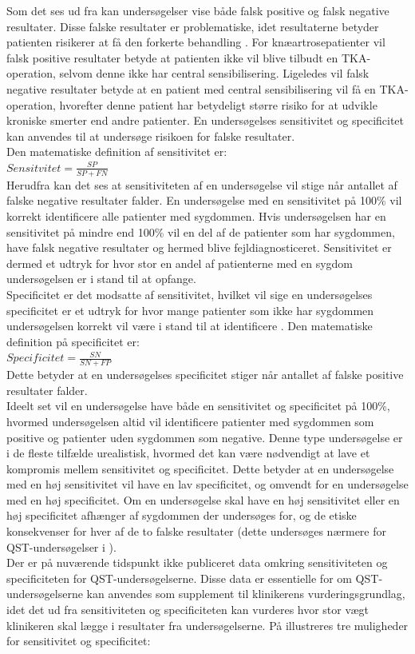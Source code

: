 Som det ses ud fra  kan undersøgelser vise både falsk positive og falsk negative resultater. Disse falske resultater er problematiske, idet resultaterne betyder patienten risikerer at få den forkerte behandling \citep{Lalkhen2008}. For knæartrosepatienter vil falsk positive resultater betyde at patienten ikke vil blive tilbudt en TKA-operation, selvom denne ikke har central sensibilisering. Ligeledes vil falsk negative resultater betyde at en patient med central sensibilisering vil få en TKA-operation, hvorefter denne patient har betydeligt større risiko for at udvikle kroniske smerter end andre patienter. En undersøgelses sensitivitet og specificitet kan anvendes til at undersøge risikoen for falske resultater. \\
Den matematiske definition af sensitivitet er: \\
$Sensitvitet=\frac{SP}{SP+FN}$ \\
Herudfra kan det ses at sensitiviteten af en undersøgelse vil stige når antallet af falske negative resultater falder. En undersøgelse med en sensitivitet på 100\% vil korrekt identificere alle patienter med sygdommen. Hvis undersøgelsen har en sensitivitet på mindre end 100\% vil en del af de patienter som har sygdommen, have falsk negative resultater og hermed blive fejldiagnosticeret. Sensitivitet er dermed et udtryk for hvor stor en andel af patienterne med en sygdom undersøgelsen er i stand til at opfange. \citep{Lalkhen2008} \\
Specificitet er det modsatte af sensitivitet, hvilket vil sige en undersøgelses specificitet er et udtryk for hvor mange patienter som ikke har sygdommen undersøgelsen korrekt vil være i stand til at identificere \citep{Lalkhen2008}. Den matematiske definition på specificitet er: \\
$Specificitet=\frac{SN}{SN+FP}$ \\
Dette betyder at en undersøgelses specificitet stiger når antallet af falske positive resultater falder. \citep{Lalkhen2008} \\
Ideelt set vil en undersøgelse have både en sensitivitet og specificitet på 100\%, hvormed undersøgelsen altid vil identificere patienter med sygdommen som positive og patienter uden sygdommen som negative. Denne type undersøgelse er i de fleste tilfælde urealistisk, hvormed det kan være nødvendigt at lave et kompromis mellem sensitivitet og specificitet. Dette betyder at en undersøgelse med en høj sensitivitet vil have en lav specificitet, og omvendt for en undersøgelse med en høj specificitet. Om en undersøgelse skal have en høj sensitivitet eller en høj specificitet afhænger af sygdommen der undersøges for, og de etiske konsekvenser for hver af de to falske resultater (dette undersøges nærmere for QST-undersøgelser i ).  \\
Der er på nuværende tidspunkt ikke publiceret data omkring sensitiviteten og specificiteten for QST-undersøgelserne. \citep{Wylde2013} Disse data er essentielle for om QST-undersøgelserne kan anvendes som supplement til klinikerens vurderingsgrundlag, idet det ud fra sensitiviteten og specificiteten kan vurderes hvor stor vægt klinikeren skal lægge i resultater fra undersøgelserne. På  illustreres tre muligheder for sensitivitet og specificitet:

